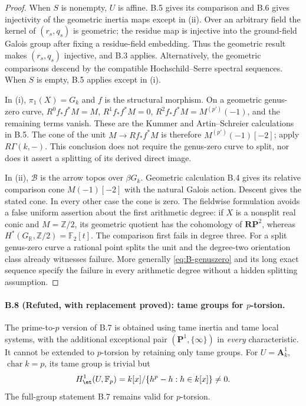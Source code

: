 \begin{proof}
When $S$ is nonempty, $U$ is affine. B.5 gives its comparison and
B.6 gives injectivity of the geometric inertia maps except in
(ii). Over an arbitrary field the kernel of $(r_s,q_s)$ is
geometric; the residue map is injective into the ground-field
Galois group after fixing a residue-field embedding. Thus the
geometric result makes $(r_s,q_s)$ injective, and B.3 applies.
Alternatively, the geometric comparisons descend by the
compatible Hochschild--Serre spectral sequences. When $S$ is
empty, B.5 applies except in (i).

In (i), $\pi_1(X)=G_k$ and $f$ is the structural morphism.
On a geometric genus-zero curve, $R^0f_*f^*M=M$,
$R^1f_*f^*M=0$, $R^2f_*f^*M=M^{(p')}(-1)$, and the remaining
terms vanish. These are the Kummer and Artin--Schreier calculations
in B.5. The cone of the unit $M\to Rf_*f^*M$ is therefore
$M^{(p')}(-1)[-2]$; apply $R\Gamma(k,-)$. This conclusion does
not require the genus-zero curve to split, nor does it assert a
splitting of its derived direct image.

In (ii), $\mathcal B$ is the arrow topos over $\beta G_k$.
Geometric calculation B.4 gives its relative comparison cone
$M(-1)[-2]$ with the natural Galois action. Descent gives the
stated cone. In every other case the cone is zero. The fieldwise
formulation avoids a false uniform assertion about the first
arithmetic degree: if $X$ is a nonsplit real conic and $M=\mathbb
Z/2$, its geometric quotient has the cohomology of $\mathbf{RP}^2$,
whereas $H^*(G_{\mathbb R},\mathbb Z/2)=\mathbb F_2[t]$.
The comparison first fails in degree three. For a split genus-zero
curve a rational point splits the unit and the degree-two
orientation class already witnesses failure. More generally
\eqref{eq:B-genuszero} and its long exact sequence specify the
failure in every arithmetic degree without a hidden splitting
assumption.
\end{proof}

\paragraph{B.8 (Refuted, with replacement proved): tame groups for $p$-torsion.}\label{B8}
The prime-to-$p$ version of B.7 is obtained using tame inertia
and tame local systems, with the additional exceptional pair
$(\mathbf P^1,\{\infty\})$ in \emph{every} characteristic.
It cannot be extended to $p$-torsion by retaining only tame groups.
For $U=\mathbf A^1_k$, $\operatorname{char}k=p$, its tame group is
trivial but
\[
 H^1_{\et}(U,\mathbb F_p)=k[x]/\{h^p-h:h\in k[x]\}\ne0.
\]
The full-group statement B.7 remains valid for $p$-torsion.

